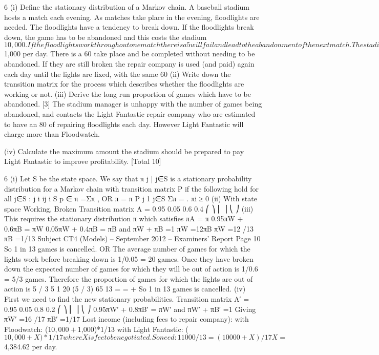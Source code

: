 \documentclass[a4paper,12pt]{article}
\begin{document}
6 (i) Define the stationary distribution of a Markov chain. 
A baseball stadium hosts a match each evening. As matches take place in the
evening, floodlights are needed. The floodlights have a tendency to break down. If
the floodlights break down, the game has to be abandoned and this costs the stadium
$10,000. If the floodlights work throughout one match there is a 5%
will fail and lead to the abandonment of the next match.
The stadium has an arrangement with the Floodwatch repair company who are
brought in the morning after a floodlight breakdown and charge $1,000 per day. There
is a 60%
take place and be completed without needing to be abandoned. If they are still broken
the repair company is used (and paid) again each day until the lights are fixed, with
the same 60%
(ii) Write down the transition matrix for the process which describes whether the
floodlights are working or not. 
(iii) Derive the long run proportion of games which have to be abandoned. [3]
The stadium manager is unhappy with the number of games being abandoned, and
contacts the Light Fantastic repair company who are estimated to have an 80%
of repairing floodlights each day. However Light Fantastic will charge more than
Floodwatch.

(iv) Calculate the maximum amount the stadium should be prepared to pay Light
Fantastic to improve profitability. 
[Total 10]

6
(i) Let S be the state space. We say that {π j | j∈S} is a stationary probability
distribution for a Markov chain with transition matrix P if the following
hold for all j∈S :
j i ij
i S
p
∈
π =Σπ , OR π = π P
j 1
j∈S
Σπ = .
πi ≥ 0
(ii) With state space {Working, Broken}
Transition matrix A =
0.95 0.05
0.6 0.4
⎛ ⎞
⎜ ⎟
⎝ ⎠
(iii) This requires the stationary distribution π which satisfies
πA = π
0.95πW + 0.6πB = πW
0.05πW + 0.4πB = πB
and πW + πB =1
πW =12πB
πW =12 /13
πB =1/13
Subject CT4 (Models) – September 2012 – Examiners’ Report
Page 10
So 1 in 13 games is cancelled.
OR
The average number of games for which the lights work before breaking
down is 1/0.05 = 20 games.
Once they have broken down the expected number of games for which
they will be out of action is 1/0.6 = 5/3 games.
Therefore the proportion of games for which the lights are out of action
is
5 / 3 5 1
20 (5 / 3) 65 13
= =
+
So 1 in 13 games is cancelled.
(iv) First we need to find the new stationary probabilities.
Transition matrix A′ =
0.95 0.05
0.8 0.2
⎛ ⎞
⎜ ⎟
⎝ ⎠
0.95πW′ + 0.8πB′ = πW′
and πW′ + πB′ =1
Giving πW′ =16 /17 πB′ =1/17
Lost income (including fees to repair company):
with Floodwatch: ($10,000 + $1,000)*1/13
with Light Fantastic: ($10,000 + X)*1/17 where X is fee to be negotiated.
So need: 11000/13 = (10000 + X)/17
X = $4,384.62 per day.
\end{document}
